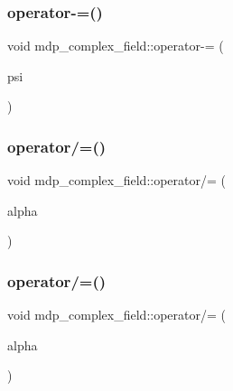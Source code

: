 \mbox{\label{classmdp__complex__field_a0385e35ddfd532f15e817dcac1adf212}} 
\subsubsection{\texorpdfstring{operator-\/=()}{operator-=()}}
{\footnotesize\ttfamily void mdp\+\_\+complex\+\_\+field\+::operator-\/= (\begin{DoxyParamCaption}\item[{\hyperlink{classmdp__complex__field}{mdp\+\_\+complex\+\_\+field} \&}]{psi }\end{DoxyParamCaption})\hspace{0.3cm}{\ttfamily [inline]}}

\mbox{\label{classmdp__complex__field_ab204658a9026e7936b8725ad4f3172ef}} 
\subsubsection{\texorpdfstring{operator/=()}{operator/=()}\hspace{0.1cm}{\footnotesize\ttfamily [1/2]}}
{\footnotesize\ttfamily void mdp\+\_\+complex\+\_\+field\+::operator/= (\begin{DoxyParamCaption}\item[{const \hyperlink{classmdp__complex}{mdp\+\_\+complex}}]{alpha }\end{DoxyParamCaption})\hspace{0.3cm}{\ttfamily [inline]}}

\mbox{\label{classmdp__complex__field_a0d2bffa4819135c1ef77c0c9fb22504e}} 
\subsubsection{\texorpdfstring{operator/=()}{operator/=()}\hspace{0.1cm}{\footnotesize\ttfamily [2/2]}}
{\footnotesize\ttfamily void mdp\+\_\+complex\+\_\+field\+::operator/= (\begin{DoxyParamCaption}\item[{const \hyperlink{mdp__global__vars_8h_a69d96b74c791e0bbdb888b3913a69450}{mdp\+\_\+real}}]{alpha }\end{DoxyParamCaption})\hspace{0.3cm}{\ttfamily [inline]}}

